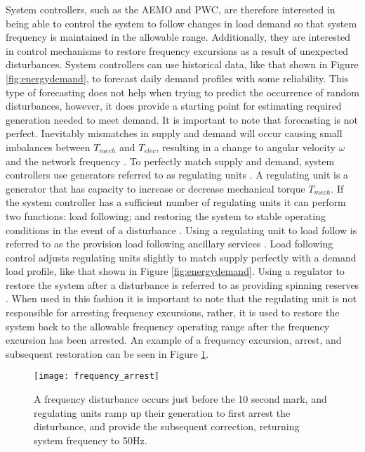 System controllers, such as the AEMO and PWC, are therefore interested in being able to control the system to follow changes in load demand so that system frequency is maintained in the allowable range. Additionally, they are interested in control mechanisms to restore frequency excursions as a result of unexpected disturbances. System controllers can use historical data, like that shown in Figure \ref{fig:energydemand}, to forecast daily demand profiles with some reliability. This type of forecasting does not help when trying to predict the occurrence of random disturbances, however, it does provide a starting point for estimating required generation needed to meet demand. It is important to note that forecasting is not perfect. Inevitably mismatches in supply and demand will occur causing small imbalances between $T_{mech}$ and $T_{elec}$, resulting in a change to angular velocity $\omega$ and the network frequency \cite{Glover2012}. To perfectly match supply and demand, system controllers use generators referred to as regulating units \cite{Kothari2011}. A regulating unit is a generator that has capacity to increase or decrease mechanical torque $T_{mech}$. If the system controller has a sufficient number of regulating units it can perform two functions: load following; and restoring the system to stable operating conditions in the event of a disturbance \cite{Grainger1994}. Using a regulating unit to load follow is referred to as the provision load following ancillary services \cite{AEMOancilliaryserv}. Load following control adjusts regulating units slightly to match supply perfectly with a demand load profile, like that shown in Figure \ref{fig:energydemand}. Using a regulator to restore the system after a disturbance is referred to as providing spinning reserves \cite{AEMOancilliaryserv}. When used in this fashion it is important to note that the regulating unit is not responsible for arresting frequency excursions, rather, it is used to restore the system back to the allowable frequency operating range after the frequency excursion has been arrested. An example of a frequency excursion, arrest, and subsequent restoration can be seen in Figure \ref{fig:freqarrest}.

\begin{figure}[ht]
\centering
\texttt{[image: frequency\_arrest]}
\caption{A frequency disturbance occurs just before the 10 second mark, and regulating units ramp up their generation to first arrest the disturbance, and provide the subsequent correction, returning system frequency to 50$\si{\hertz}$.}
\label{fig:freqarrest}
\end{figure}

